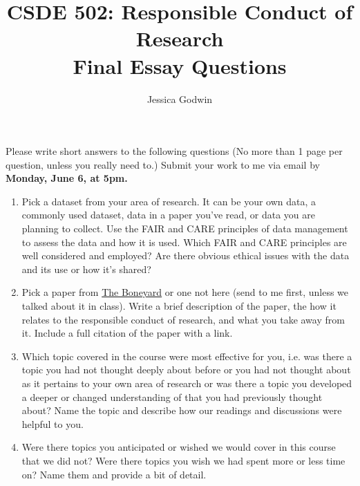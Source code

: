 \documentclass[11pt]{article}
\title{CSDE 502: Responsible Conduct of Research\\ Final Essay Questions}
\author{Jessica Godwin}
\begin{document}
\maketitle

\noindent Please write short answers to the following questions (No more than 1 page per question, unless you really need to.) Submit your work to me via email by \textbf{Monday, June 6, at 5pm.}

\begin{enumerate}
\item Pick a dataset from your area of research. It can be your own data, a commonly used dataset, data in a paper you've read, or data you are planning to collect. Use the FAIR and CARE principles of data management to assess the data and how it is used. Which FAIR and CARE principles are well considered and employed? Are there obvious ethical issues with the data and its use or how it's shared? 
\item Pick a paper from \href{https://jlgodwin.github.io/CSDE502-Sp22/#boneyard}{The Boneyard} or one not here (send to me first, unless we talked about it in class). Write a brief description of the paper, the how it relates to the responsible conduct of research, and what you take away from it. Include a full citation of the paper with a link.
\item Which topic covered in the course were most effective for you, i.e. was there a topic you had not thought deeply about before or you had not thought about as it pertains to your own area of research or was there a topic you developed a deeper or changed understanding of that you had previously thought about? Name the topic and describe how our readings and discussions were helpful to you.
\item Were there topics you anticipated or wished we would cover in this course that we did not? Were there topics you wish we had spent more or less time on? Name them and provide a bit of detail.
\end{enumerate}
\end{document}
